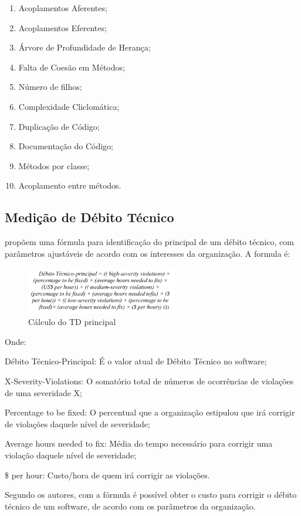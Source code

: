 \begin{enumerate}
  \item Acoplamentos Aferentes;
  \item Acoplamentos Eferentes;
  \item Árvore de Profundidade de Herança;
  \item Falta de Coesão em Métodos;
  \item Número de filhos;
  \item Complexidade Cliclomática;
  \item Duplicação de Código;
  \item Documentação do Código;
  \item Métodos por classe;
  \item Acoplamento entre métodos.
\end{enumerate}

\subsection{Medição de Débito Técnico}
\cite{principal} propõem uma fórmula para identificação do principal de um
débito técnico, com parâmetros ajustáveis de acordo com os interesses da
organização. A formula é:

\begin{figure}[h]
  \centering
  \includegraphics[width=250px, scale=1]{figuras/formulaprincipal}
  \caption{Cálculo do TD principal}
\end{figure}
Onde:

Débito Técnico-Principal: É o valor atual de Débito Técnico no software;

X-Severity-Violations: O somatório total de números de ocorrências de violações
de uma severidade X;

Percentage to be fixed: O percentual que a organização estipulou que irá corrigir
de violações daquele nível de severidade;

Average hours needed to fix: Média do tempo necessário para corrigir uma violação
daquele nível de severidade;

\$ per hour: Custo/hora de quem irá corrigir as violações.

Segundo os autores, com a fórmula é possível obter o custo para corrigir o débito
técnico de um software, de acordo com os parâmetros da organização.

